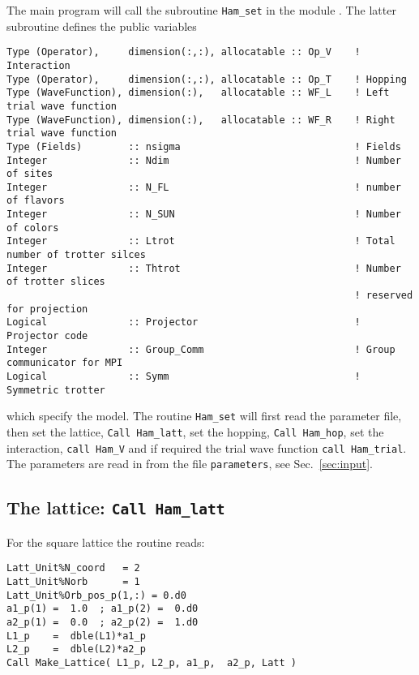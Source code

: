 The main program will call the subroutine   \texttt{Ham\_set} in the module .
The latter  subroutine  defines the  public variables
\begin{lstlisting}[style=fortran]
Type (Operator),     dimension(:,:), allocatable :: Op_V    ! Interaction
Type (Operator),     dimension(:,:), allocatable :: Op_T    ! Hopping
Type (WaveFunction), dimension(:),   allocatable :: WF_L    ! Left trial wave function
Type (WaveFunction), dimension(:),   allocatable :: WF_R    ! Right trial wave function
Type (Fields)        :: nsigma                              ! Fields
Integer              :: Ndim	                            ! Number of sites
Integer              :: N_FL                                ! number of flavors
Integer              :: N_SUN	                            ! Number of colors 
Integer              :: Ltrot                               ! Total number of trotter silces
Integer              :: Thtrot                              ! Number of trotter slices 
                                                            ! reserved for projection
Logical              :: Projector                           ! Projector code
Integer              :: Group_Comm                          ! Group communicator for MPI
Logical              :: Symm                                ! Symmetric trotter 
\end{lstlisting}
which specify the model.  The  routine \texttt{Ham\_set}  will first  read the parameter file,  then set the lattice, \texttt{Call Ham\_latt},  set the hopping, \texttt{Call Ham\_hop},  
 set the interaction, 
\texttt{call Ham\_V}  and  if required the  trial wave function \texttt{call Ham\_trial}. 
The parameters are read in from the file \texttt{parameters}, see Sec.~\ref{sec:input}.

\subsection{The lattice:   \texttt{Call Ham\_latt} }

For the square lattice  the routine reads:
\begin{lstlisting}[style=fortran]
Latt_Unit%N_coord   = 2
Latt_Unit%Norb      = 1
Latt_Unit%Orb_pos_p(1,:) = 0.d0
a1_p(1) =  1.0  ; a1_p(2) =  0.d0
a2_p(1) =  0.0  ; a2_p(2) =  1.d0
L1_p    =  dble(L1)*a1_p
L2_p    =  dble(L2)*a2_p
Call Make_Lattice( L1_p, L2_p, a1_p,  a2_p, Latt )
\end{lstlisting}

